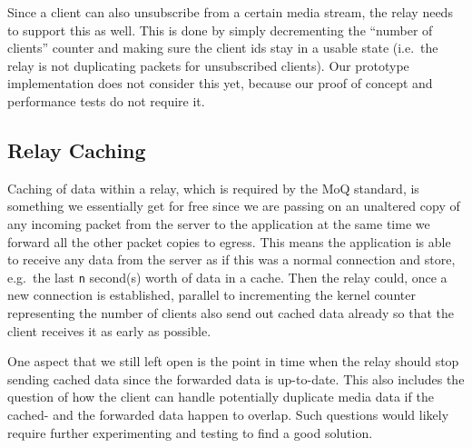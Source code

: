 Since a client can also unsubscribe from a certain media stream, the relay needs to support
this as well.
This is done by simply decrementing the ``number of clients'' counter and making sure the 
client ids stay in a usable state (i.e.~the relay is not duplicating packets for unsubscribed 
clients).
Our prototype implementation does not consider this yet, because our proof of concept and 
performance tests do not require it.

\subsection{Relay Caching}
Caching of data within a relay, which is required by the MoQ standard, is something we essentially get
for free since we are passing on an unaltered copy of any incoming packet from the server to the 
application at the same time we forward all the other packet copies to egress.
This means the application is able to receive any data from the server as if this was a normal connection and 
store, e.g.~the last \verb|n| second(s) worth of data in a cache.
Then the relay could, once a new connection is established, parallel to incrementing the kernel counter 
representing the number of clients also send out cached data already so that the client receives it
as early as possible.

One aspect that we still left open is the point in time when the relay should stop 
sending cached data since the forwarded data is up-to-date.
This also includes the question of how the client can handle potentially duplicate media data if the 
cached- and the forwarded data happen to overlap.
Such questions would likely require further experimenting and testing to find a good solution.
